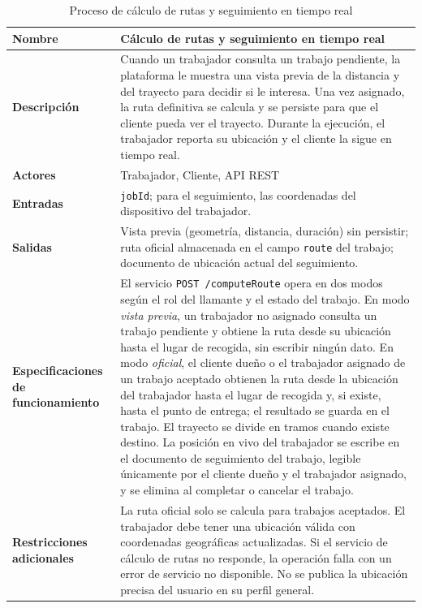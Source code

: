 \documentclass[doc,12pt,a4paper]{apa7}
\begin{document}
\begin{longtable}{|P{3.3cm}|L{11.2cm}|}
\caption{Proceso de cálculo de rutas y seguimiento en tiempo real}\\
\hline
\textbf{Nombre} & Cálculo de rutas y seguimiento en tiempo real \\ \hline
\textbf{Descripción} & Cuando un trabajador consulta un trabajo pendiente, la plataforma le muestra una vista previa de la distancia y del trayecto para decidir si le interesa. Una vez asignado, la ruta definitiva se calcula y se persiste para que el cliente pueda ver el trayecto. Durante la ejecución, el trabajador reporta su ubicación y el cliente la sigue en tiempo real. \\ \hline
\textbf{Actores} & Trabajador, Cliente, API REST \\ \hline
\textbf{Entradas} & \texttt{jobId}; para el seguimiento, las coordenadas del dispositivo del trabajador. \\ \hline
\textbf{Salidas} & Vista previa (geometría, distancia, duración) sin persistir; ruta oficial almacenada en el campo \texttt{route} del trabajo; documento de ubicación actual del seguimiento. \\ \hline
\textbf{Especificaciones de funcionamiento} & El servicio \texttt{POST /computeRoute} opera en dos modos según el rol del llamante y el estado del trabajo. En modo \textit{vista previa}, un trabajador no asignado consulta un trabajo pendiente y obtiene la ruta desde su ubicación hasta el lugar de recogida, sin escribir ningún dato. En modo \textit{oficial}, el cliente dueño o el trabajador asignado de un trabajo aceptado obtienen la ruta desde la ubicación del trabajador hasta el lugar de recogida y, si existe, hasta el punto de entrega; el resultado se guarda en el trabajo. El trayecto se divide en tramos cuando existe destino. La posición en vivo del trabajador se escribe en el documento de seguimiento del trabajo, legible únicamente por el cliente dueño y el trabajador asignado, y se elimina al completar o cancelar el trabajo. \\ \hline
\textbf{Restricciones adicionales} & La ruta oficial solo se calcula para trabajos aceptados. El trabajador debe tener una ubicación válida con coordenadas geográficas actualizadas. Si el servicio de cálculo de rutas no responde, la operación falla con un error de servicio no disponible. No se publica la ubicación precisa del usuario en su perfil general. \\ \hline
\end{longtable}
\end{document}
